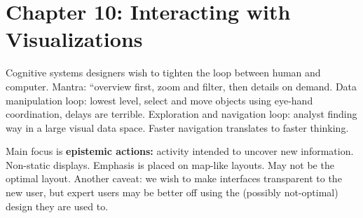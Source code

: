 \section{Chapter 10: Interacting with Visualizations}
\graphicspath{ {pngs/ch10/} }

\secttoc

Cognitive systems designers wish to tighten the loop between human and
computer.
Mantra: ``overview first, zoom and filter, then details on demand.
Data manipulation loop: lowest level, select and move objects using eye-hand
coordination, delays are terrible. Exploration and navigation loop: analyst
finding way in a large visual data space. Faster navigation translates to
faster thinking.

Main focus is \textbf{epistemic actions:} activity intended to uncover new
information. Non-static displays.
Emphasis is placed on map-like layouts. May not be the optimal layout.
Another caveat: we wish to make interfaces transparent to the new user, but
expert users may be better off using the (possibly not-optimal) design they are
used to.

